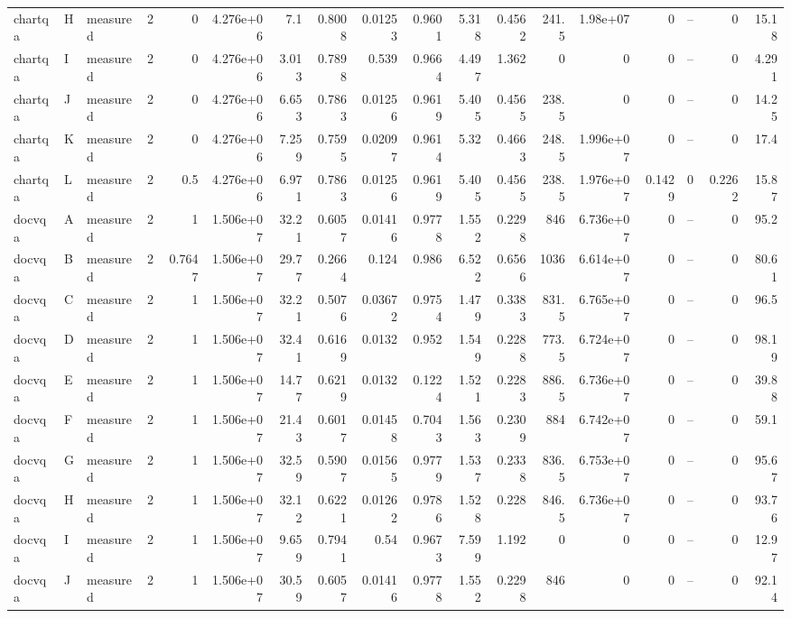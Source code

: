 \begin{longtable}{lllrrrrrrrrrrrrrrr}
chartqa & H & measured & 2 & 0 & 4.276e+06 & 7.1 & 0.8008 & 0.01253 & 0.9601 & 5.318 & 0.4562 & 241.5 & 1.98e+07 & 0 & -- & 0 & 15.18 \\
chartqa & I & measured & 2 & 0 & 4.276e+06 & 3.013 & 0.7898 & 0.539 & 0.9664 & 4.497 & 1.362 & 0 & 0 & 0 & -- & 0 & 4.291 \\
chartqa & J & measured & 2 & 0 & 4.276e+06 & 6.653 & 0.7863 & 0.01256 & 0.9619 & 5.405 & 0.4565 & 238.5 & 0 & 0 & -- & 0 & 14.25 \\
chartqa & K & measured & 2 & 0 & 4.276e+06 & 7.259 & 0.7595 & 0.02097 & 0.9614 & 5.32 & 0.4663 & 248.5 & 1.996e+07 & 0 & -- & 0 & 17.4 \\
chartqa & L & measured & 2 & 0.5 & 4.276e+06 & 6.971 & 0.7863 & 0.01256 & 0.9619 & 5.405 & 0.4565 & 238.5 & 1.976e+07 & 0.1429 & 0 & 0.2262 & 15.87 \\
docvqa & A & measured & 2 & 1 & 1.506e+07 & 32.21 & 0.6057 & 0.01416 & 0.9778 & 1.552 & 0.2298 & 846 & 6.736e+07 & 0 & -- & 0 & 95.2 \\
docvqa & B & measured & 2 & 0.7647 & 1.506e+07 & 29.77 & 0.2664 & 0.124 & 0.986 & 6.522 & 0.6566 & 1036 & 6.614e+07 & 0 & -- & 0 & 80.61 \\
docvqa & C & measured & 2 & 1 & 1.506e+07 & 32.21 & 0.5076 & 0.03672 & 0.9754 & 1.479 & 0.3383 & 831.5 & 6.765e+07 & 0 & -- & 0 & 96.5 \\
docvqa & D & measured & 2 & 1 & 1.506e+07 & 32.41 & 0.6169 & 0.0132 & 0.952 & 1.549 & 0.2288 & 773.5 & 6.724e+07 & 0 & -- & 0 & 98.19 \\
docvqa & E & measured & 2 & 1 & 1.506e+07 & 14.77 & 0.6219 & 0.0132 & 0.1224 & 1.521 & 0.2283 & 886.5 & 6.736e+07 & 0 & -- & 0 & 39.88 \\
docvqa & F & measured & 2 & 1 & 1.506e+07 & 21.43 & 0.6017 & 0.01458 & 0.7043 & 1.563 & 0.2309 & 884 & 6.742e+07 & 0 & -- & 0 & 59.1 \\
docvqa & G & measured & 2 & 1 & 1.506e+07 & 32.59 & 0.5907 & 0.01565 & 0.9779 & 1.537 & 0.2338 & 836.5 & 6.753e+07 & 0 & -- & 0 & 95.67 \\
docvqa & H & measured & 2 & 1 & 1.506e+07 & 32.12 & 0.6221 & 0.01262 & 0.9786 & 1.528 & 0.228 & 846.5 & 6.736e+07 & 0 & -- & 0 & 93.76 \\
docvqa & I & measured & 2 & 1 & 1.506e+07 & 9.659 & 0.7941 & 0.54 & 0.9673 & 7.599 & 1.192 & 0 & 0 & 0 & -- & 0 & 12.97 \\
docvqa & J & measured & 2 & 1 & 1.506e+07 & 30.59 & 0.6057 & 0.01416 & 0.9778 & 1.552 & 0.2298 & 846 & 0 & 0 & -- & 0 & 92.14 \\

\end{longtable}
